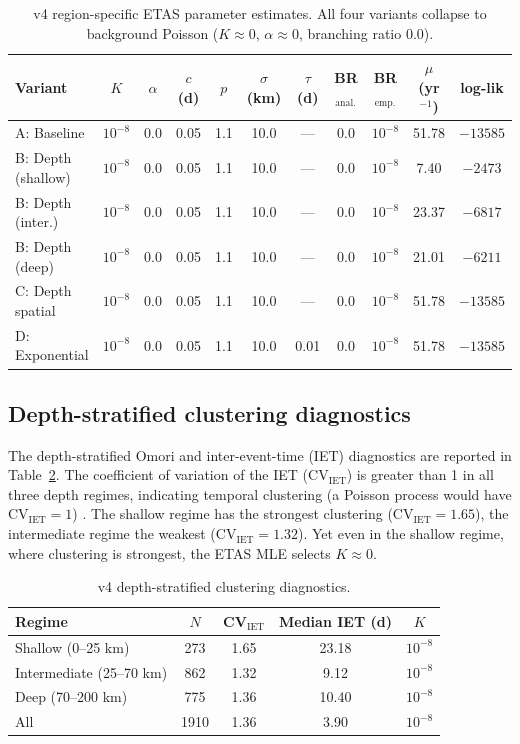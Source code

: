 \documentclass[10pt,a4paper,twocolumn]{article}
\begin{document}
\begin{table}[t]
\centering
\caption{v4 region-specific ETAS parameter estimates. All four variants collapse to background Poisson ($K\approx0$, $\alpha\approx0$, branching ratio 0.0).}\label{tab:v4-params}
\small
\begin{tabular*}{\textwidth}{@{\extracolsep{\fill}}lcccccccccc}
\toprule
Variant & $K$ & $\alpha$ & $c$ (d) & $p$ & $\sigma$ (km) & $\tau$ (d) & BR$_{\text{anal.}}$ & BR$_{\text{emp.}}$ & $\mu$ (yr$^{-1}$) & log-lik \\
\midrule
A: Baseline         & $10^{-8}$ & 0.0 & 0.05 & 1.1 & 10.0 & --- & 0.0 & $10^{-8}$ & 51.78 & $-13585$ \\
B: Depth (shallow)  & $10^{-8}$ & 0.0 & 0.05 & 1.1 & 10.0 & --- & 0.0 & $10^{-8}$ & 7.40  & $-2473$ \\
B: Depth (inter.)   & $10^{-8}$ & 0.0 & 0.05 & 1.1 & 10.0 & --- & 0.0 & $10^{-8}$ & 23.37 & $-6817$ \\
B: Depth (deep)     & $10^{-8}$ & 0.0 & 0.05 & 1.1 & 10.0 & --- & 0.0 & $10^{-8}$ & 21.01 & $-6211$ \\
C: Depth spatial    & $10^{-8}$ & 0.0 & 0.05 & 1.1 & 10.0 & --- & 0.0 & $10^{-8}$ & 51.78 & $-13585$ \\
D: Exponential      & $10^{-8}$ & 0.0 & 0.05 & 1.1 & 10.0 & 0.01 & 0.0 & $10^{-8}$ & 51.78 & $-13585$ \\
\bottomrule
\end{tabular*}
\end{table}

\subsection{Depth-stratified clustering diagnostics}

The depth-stratified Omori and inter-event-time (IET) diagnostics are reported in Table~\ref{tab:v4-depth}. The coefficient of variation of the IET (CV$_{\text{IET}}$) is greater than 1 in all three depth regimes, indicating temporal clustering (a Poisson process would have CV$_{\text{IET}}=1$) \cite{heuer2012}. The shallow regime has the strongest clustering (CV$_{\text{IET}}=1.65$), the intermediate regime the weakest (CV$_{\text{IET}}=1.32$). Yet even in the shallow regime, where clustering is strongest, the ETAS MLE selects $K\approx0$.

\begin{table}[t]
\centering
\caption{v4 depth-stratified clustering diagnostics.}\label{tab:v4-depth}
\small
\begin{tabular*}{\columnwidth}{@{\extracolsep{\fill}}lcccc}
\toprule
Regime & $N$ & CV$_{\text{IET}}$ & Median IET (d) & $K$ \\
\midrule
Shallow (0--25 km)       & 273 & 1.65 & 23.18 & $10^{-8}$ \\
Intermediate (25--70 km) & 862 & 1.32 & 9.12  & $10^{-8}$ \\
Deep (70--200 km)        & 775 & 1.36 & 10.40 & $10^{-8}$ \\
All                      & 1910 & 1.36 & 3.90  & $10^{-8}$ \\
\bottomrule
\end{tabular*}
\end{table}
\end{document}
